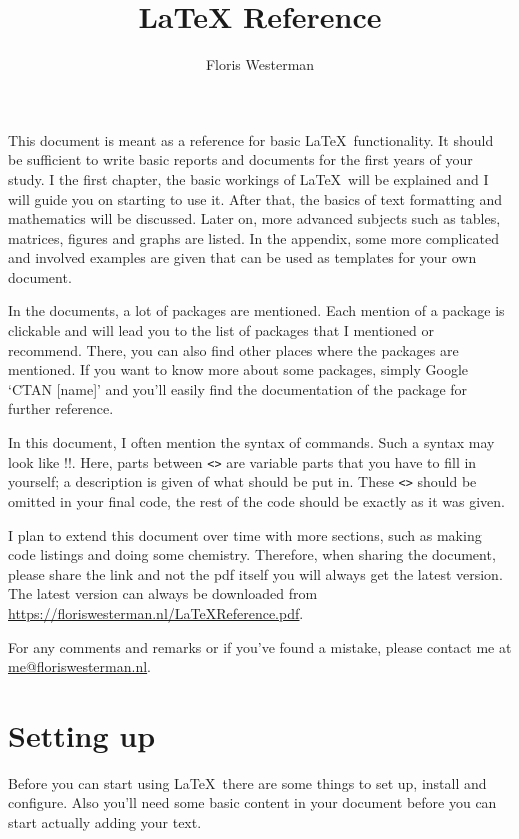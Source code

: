 \documentclass[a4paper,10pt]{article}
\title{LaTeX Reference}
\author{Floris Westerman}
\begin{document}
\maketitle

This document is meant as a reference for basic \LaTeX\ functionality. It should be sufficient to write basic reports and documents for the first years of your study. I the first chapter, the basic workings of \LaTeX\ will be explained and I will guide you on starting to use it. After that, the basics of text formatting and mathematics will be discussed. Later on, more advanced subjects such as tables, matrices, figures and graphs are listed. In the appendix, some more complicated and involved examples are given that can be used as templates for your own document.

In the documents, a lot of packages are mentioned. Each mention of a package is clickable and will lead you to the list of packages that I mentioned or recommend. There, you can also find other places where the packages are mentioned. If you want to know more about some packages, simply Google `CTAN [name]' and you'll easily find the documentation of the package for further reference.

In this document, I often mention the syntax of commands. Such a syntax may look like \tex!!. Here, parts between {\tt <>} are variable parts that you have to fill in yourself; a description is given of what should be put in. These {\tt <>} should be omitted in your final code, the rest of the code should be exactly as it was given.

I plan to extend this document over time with more sections, such as making code listings and doing some chemistry. Therefore, when sharing the document, please share the link and not the pdf itself you will always get the latest version. The latest version can always be downloaded from \underline{\url{https://floriswesterman.nl/LaTeXReference.pdf}}.

For any comments and remarks or if you've found a mistake, please contact me at \newline \underline{\href{mailto:me@floriswesterman.nl}{me@floriswesterman.nl}}.

\newpage
\tableofcontents


\newpage
\section{Setting up}
Before you can start using \LaTeX\ there are some things to set up, install and configure. Also you'll need some basic content in your document before you can start actually adding your text.
\end{document}
